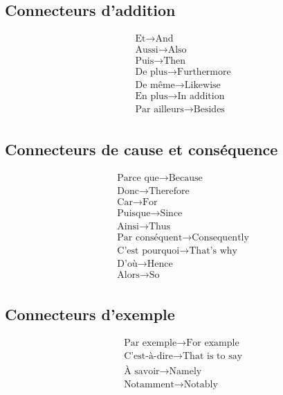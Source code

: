 \documentclass[12pt, a4paper]{article}
\begin{document}
\begin{multicols*}{3}
\subsection{Connecteurs d'addition}
\vspace{-10pt}
\begin{align*}
  &\text{Et} \rightarrow \text{And}\\
  &\text{Aussi} \rightarrow \text{Also}\\
  &\text{Puis} \rightarrow \text{Then}\\
  &\text{De plus} \rightarrow \text{Furthermore}\\
  &\text{De même} \rightarrow \text{Likewise}\\
  &\text{En plus} \rightarrow \text{In addition}\\
  &\text{Par ailleurs} \rightarrow \text{Besides}\\
\end{align*}
\vspace{-40pt}

\subsection{Connecteurs de cause et conséquence}
\vspace{-10pt}
\begin{align*}
  &\text{Parce que} \rightarrow \text{Because}\\
  &\text{Donc} \rightarrow \text{Therefore}\\
  &\text{Car} \rightarrow \text{For}\\
  &\text{Puisque} \rightarrow \text{Since}\\
  &\text{Ainsi} \rightarrow \text{Thus}\\
  &\text{Par conséquent} \rightarrow \text{Consequently}\\
  &\text{C'est pourquoi} \rightarrow \text{That’s why}\\
  &\text{D'où} \rightarrow \text{Hence}\\
  &\text{Alors} \rightarrow \text{So}\\
\end{align*}
\vspace{-40pt}
\subsection{Connecteurs d’exemple}
\vspace{-10pt}
\begin{align*}
  &\text{Par exemple} \rightarrow \text{For example}\\
  &\text{C'est-à-dire} \rightarrow \text{That is to say}\\
  &\text{À savoir} \rightarrow \text{Namely}\\
  &\text{Notamment} \rightarrow \text{Notably}\\
\end{align*}
\vspace{-40pt}



\end{multicols*}
\end{document}
